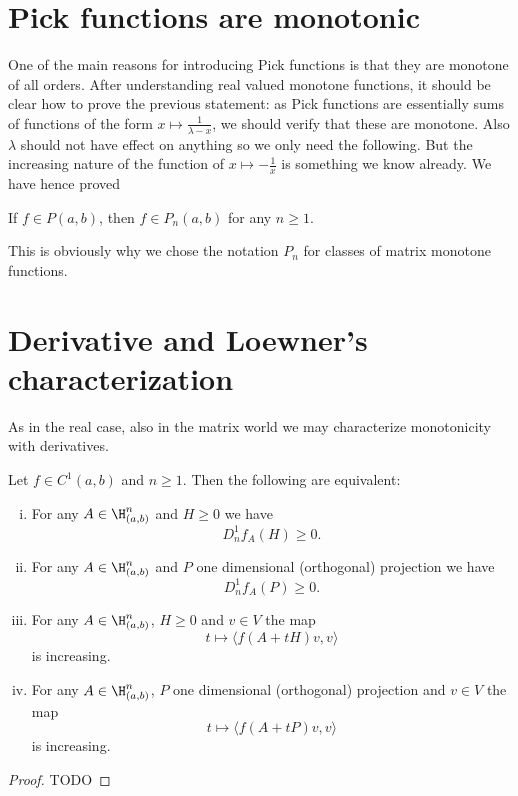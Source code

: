 \section{Pick functions are monotonic}
One of the main reasons for introducing Pick functions is that they are monotone of all orders. After understanding real valued monotone functions, it should be clear how to prove the previous statement: as Pick functions are essentially sums of functions of the form $x \mapsto \frac{1}{\lambda - x}$, we should verify that these are monotone. Also $\lambda$ should not have effect on anything so we only need the following. But the increasing nature of the function of $x \mapsto -\frac{1}{x}$ is something we know already. We have hence proved 
\begin{lause}
	If $f \in P(a, b)$, then $f \in P_{n}(a, b)$ for any $n \geq 1$.
\end{lause}
This is obviously why we chose the notation $P_{n}$ for classes of matrix monotone functions.

\section{Derivative and Loewner's characterization}

As in the real case, also in the matrix world we may characterize monotonicity with derivatives.

\begin{lause}
	Let $f \in C^{1}(a, b)$ and $n \geq 1$. Then the following are equivalent:
	\begin{enumerate}[(i)]
	\item For any $A \in \H^{n}_{(a, b)}$ and $H \geq 0$ we have
	\[
		D^{1}_{n}f_{A}(H) \geq 0.
	\]
	\item For any $A \in \H^{n}_{(a, b)}$ and $P$ one dimensional (orthogonal) projection we have
	\[
		D^{1}_{n}f_{A}(P) \geq 0.
	\]
	\item For any $A \in \H^{n}_{(a, b)}$, $H \geq 0$ and $v \in V$ the map
	\[
		t \mapsto \langle f(A + t H) v, v \rangle
	\]
	is increasing.
	\item For any $A \in \H^{n}_{(a, b)}$, $P$ one dimensional (orthogonal) projection and $v \in V$ the map
	\[
		t \mapsto \langle f(A + t P) v, v \rangle
	\]
	is increasing.
	\end{enumerate}
\end{lause}
\begin{proof}
	TODO
\end{proof}

